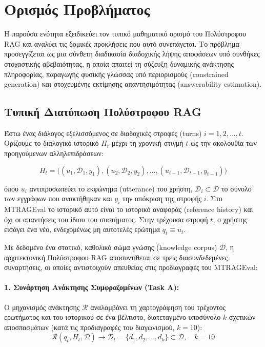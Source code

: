 \section{Ορισμός Προβλήματος}

Η παρούσα ενότητα εξειδικεύει τον τυπικό μαθηματικό ορισμό του Πολύστροφου RAG και αναλύει τις δομικές προκλήσεις που αυτό συνεπάγεται. Το πρόβλημα προσεγγίζεται ως μια σύνθετη διαδικασία διαδοχικής λήψης αποφάσεων υπό συνθήκες στοχαστικής αβεβαιότητας, η οποία απαιτεί τη σύζευξη δυναμικής ανάκτησης πληροφορίας, παραγωγής φυσικής γλώσσας υπό περιορισμούς (constrained generation) και στοχευμένης εκτίμησης απαντησιμότητας (answerability estimation).

\subsection{Τυπική Διατύπωση Πολύστροφου RAG}

Έστω ένας διάλογος εξελισσόμενος σε διαδοχικές στροφές (turns) $i = 1, 2, \dots, t$. Ορίζουμε το διαλογικό ιστορικό $H_t$ μέχρι τη χρονική στιγμή $t$ ως την ακολουθία των προηγούμενων αλληλεπιδράσεων:

\begin{equation}
H_t = \Big( (u_1, \mathcal{D}_1, y_1), (u_2, \mathcal{D}_2, y_2), \dots, (u_{t-1}, \mathcal{D}_{t-1}, y_{t-1}) \Big)
\end{equation}

όπου $u_i$ αντιπροσωπεύει το εκφώνημα (utterance) του χρήστη, $\mathcal{D}_i \subset \mathcal{D}$ το σύνολο των εγγράφων που ανακτήθηκαν και $y_i$ την απόκριση της στροφής $i$. Στο MTRAGEval το ιστορικό αυτό είναι το ιστορικό αναφοράς (reference history) και όχι οι απαντήσεις του ίδιου του συστήματος. Στην τρέχουσα στροφή $t$, ο χρήστης εισάγει ένα νέο, ενδεχομένως μη αυτοτελές ερώτημα $q_t \equiv u_t$.

Με δεδομένο ένα στατικό, καθολικό σώμα γνώσης (knowledge corpus) $\mathcal{D}$, η αρχιτεκτονική Πολύστροφου RAG αποσυντίθεται σε τρεις διασυνδεδεμένες συναρτήσεις, οι οποίες αντιστοιχούν απευθείας στις προδιαγραφές του MTRAGEval:

\paragraph{1. Συνάρτηση Ανάκτησης Συμφραζομένων (Task A):}
Ο μηχανισμός ανάκτησης $\mathcal{R}$ αναλαμβάνει τη χαρτογράφηση του τρέχοντος ερωτήματος και του ιστορικού σε ένα βέλτιστο, διατεταγμένο υποσύνολο $k$ σχετικών αποσπασμάτων (κατά τις προδιαγραφές του διαγωνισμού, $k=10$):
\begin{equation}
\mathcal{R}(q_t, H_t, \mathcal{D}) \rightarrow \mathcal{D}_t = \{d_1, d_2, \dots, d_k\} \subset \mathcal{D}, \quad k=10
\end{equation}

